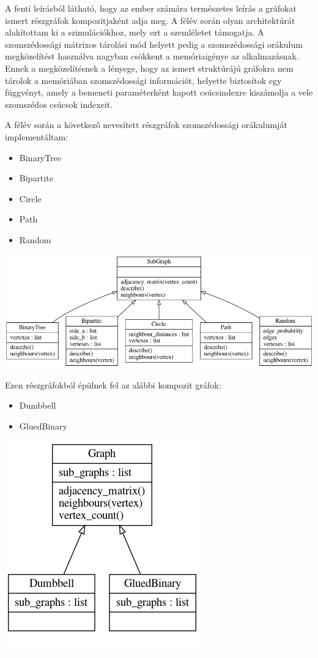 A fenti leírásból látható, hogy az ember számára természetes leírás a gráfokat
ismert részgráfok kompozitjaként adja meg. A félév során olyan architektúrát
alakítottam ki a szimulációkhoz, mely ezt a szemléletet támogatja. A
szomszédossági mátrixos tárolási mód helyett pedig a szomszédossági orákulum
megközelítést használva nagyban csökkent a memóriaigénye az alkalmazásnak.
Ennek a megközelítésnek a lényege, hogy az ismert struktúrájú gráfokra nem
tárolok a memóriában szomszédossági információt, helyette biztosítok egy
függvényt, amely a bemeneti paraméterként kapott csúcsindexre kiszámolja a vele
szomszédos csúcsok indexeit.

A félév során a következő nevesített részgráfok szomszédossági orákulumját
implementáltam:

\begin{itemize}
  \item BinaryTree
  \item Bipartite
  \item Circle
  \item Path
  \item Random
\end{itemize}

\begin{center}
  \includegraphics[width=\linewidth]{./figures/subgraph.png}
\end{center}

Ezen részgráfokból épülnek fel az alábbi kompozit gráfok:
\begin{itemize}
  \item Dumbbell
  \item GluedBinary
\end{itemize}

\begin{center}
  \includegraphics[width=0.4\linewidth]{./figures/graph.png}
\end{center}

